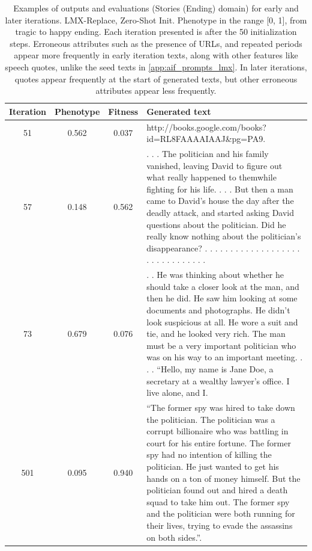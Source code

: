 \begin{table}[ht]
  \caption{Examples of outputs and evaluations (Stories (Ending) domain) for early and later iterations. LMX-Replace, Zero-Shot Init. Phenotype in the range [0, 1], from tragic to happy ending. Each iteration presented is after the 50 initialization steps. Erroneous attributes such as the presence of URLs, and repeated periods appear more frequently in early iteration texts, along with other features like speech quotes, unlike the seed texts in \ref{app:aif_prompts_lmx}. In later iterations, quotes appear frequently at the start of generated texts, but other erroneous attributes appear less frequently. }
  \begin{center}
  \small
  \begin{tabular}{cccp{8.5cm}}
    \toprule
    Iteration     & Phenotype  & Fitness     & Generated text \\
    \midrule
    51 &  0.562 & 0.037 &  http://books.google.com/books?id=RL8FAAAAIAAJ\&pg=PA9. \\
    \midrule
    57 & 0.148 & 0.562 &  . . . The politician and his family vanished, leaving David to figure out what really happened to them\textemdash{}while fighting for his life. . . . But then a man came to David's house the day after the deadly attack, and started asking David questions about the politician. Did he really know nothing about the politician's disappearance? . . . . . . . . . . . . . . . . . . . . . . . . . . . . . . . \\
    \midrule
    73 & 0.679 & 0.076 &   . . He was thinking about whether he should take a closer look at the man, and then he did. He saw him looking at some documents and photographs. He didn’t look suspicious at all. He wore a suit and tie, and he looked very rich. The man must be a very important politician who was on his way to an important meeting. . . . “Hello, my name is Jane Doe, a secretary at a wealthy lawyer’s office. I live alone, and I. \\
    \midrule
    \midrule
    501 &  0.095 & 0.940 & “The former spy was hired to take down the politician. The politician was a corrupt billionaire who was battling in court for his entire fortune. The former spy had no intention of killing the politician. He just wanted to get his hands on a ton of money himself. But the politician found out and hired a death squad to take him out. The former spy and the politician were both running for their lives, trying to evade the assassins on both sides.”. \\
    \midrule

\end{tabular}
\end{center}
\end{table}
